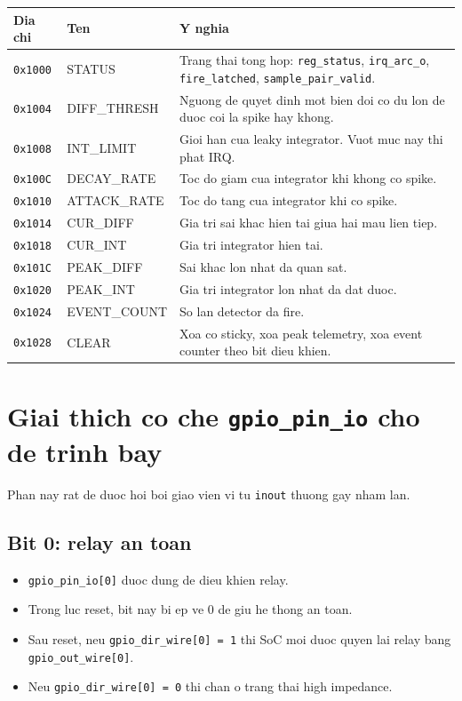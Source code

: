 \documentclass[12pt,a4paper]{article}
\begin{document}
\begin{longtable}{>{\ttfamily}p{2.3cm} >{\ttfamily}p{2cm} p{9.5cm}}
\toprule
\textnormal{Dia chi} & \textnormal{Ten} & \textnormal{Y nghia} \\
\midrule
\endhead
\texttt{0x1000} & STATUS & Trang thai tong hop: \texttt{reg\_status}, \texttt{irq\_arc\_o}, \texttt{fire\_latched}, \texttt{sample\_pair\_valid}. \\
\texttt{0x1004} & DIFF\_THRESH & Nguong de quyet dinh mot bien doi co du lon de duoc coi la spike hay khong. \\
\texttt{0x1008} & INT\_LIMIT & Gioi han cua leaky integrator. Vuot muc nay thi phat IRQ. \\
\texttt{0x100C} & DECAY\_RATE & Toc do giam cua integrator khi khong co spike. \\
\texttt{0x1010} & ATTACK\_RATE & Toc do tang cua integrator khi co spike. \\
\texttt{0x1014} & CUR\_DIFF & Gia tri sai khac hien tai giua hai mau lien tiep. \\
\texttt{0x1018} & CUR\_INT & Gia tri integrator hien tai. \\
\texttt{0x101C} & PEAK\_DIFF & Sai khac lon nhat da quan sat. \\
\texttt{0x1020} & PEAK\_INT & Gia tri integrator lon nhat da dat duoc. \\
\texttt{0x1024} & EVENT\_COUNT & So lan detector da fire. \\
\texttt{0x1028} & CLEAR & Xoa co sticky, xoa peak telemetry, xoa event counter theo bit dieu khien. \\
\bottomrule
\end{longtable}

\section{Giai thich co che \texttt{gpio\_pin\_io} cho de trinh bay}
Phan nay rat de duoc hoi boi giao vien vi tu \texttt{inout} thuong gay nham lan.

\subsection{Bit 0: relay an toan}
\begin{itemize}
    \item \texttt{gpio\_pin\_io[0]} duoc dung de dieu khien relay.
    \item Trong luc reset, bit nay bi ep ve 0 de giu he thong an toan.
    \item Sau reset, neu \texttt{gpio\_dir\_wire[0] = 1} thi SoC moi duoc quyen lai relay bang \texttt{gpio\_out\_wire[0]}.
    \item Neu \texttt{gpio\_dir\_wire[0] = 0} thi chan o trang thai high impedance.
\end{itemize}
\end{document}
